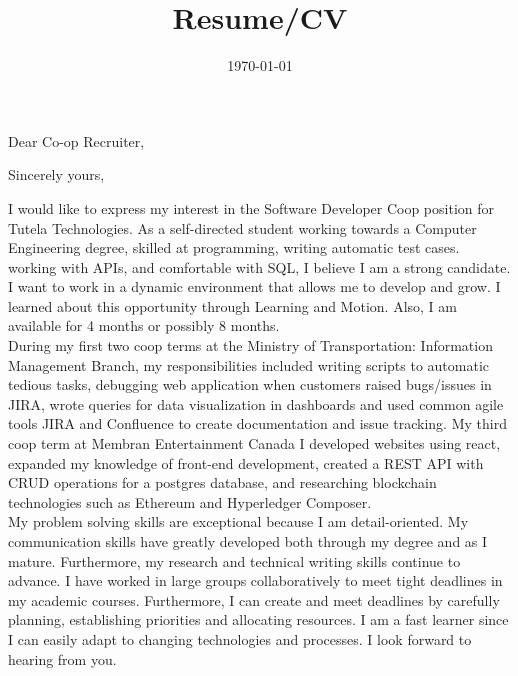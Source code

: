 \documentclass[11pt,a4paper,sans]{moderncv} %
\title{Resume/CV}
\newcommand{\companyName}{Tutela Technologies}%
\newcommand{\positionName}{Software Developer }%
\begin{document}


\clearpage

\recipient{HR Department}{\companyName}
\date{\today} %
\opening{Dear Co-op Recruiter,}
\closing{Sincerely yours, } %

\makelettertitle %
I would like to express my interest in the \positionName Coop position for \companyName. As a self-directed student working towards a Computer Engineering degree, skilled at programming, writing automatic test cases. working with APIs, and comfortable with SQL, I believe I am a strong candidate. I want to work in a dynamic environment that allows me to develop and grow. I learned about this opportunity through Learning and Motion. Also, I am available for 4 months or possibly 8 months. 
 \hfill \break \\

During my first two coop terms at the Ministry of Transportation: Information Management Branch, my responsibilities included writing scripts to automatic tedious tasks, debugging web application when customers raised bugs/issues in JIRA, wrote queries for data visualization in dashboards and used common agile tools JIRA and Confluence to create documentation and issue tracking. My third coop term at Membran Entertainment Canada I developed websites using react, expanded my knowledge of front-end development, created a REST API with CRUD operations for a postgres database, and researching blockchain technologies such as Ethereum and Hyperledger Composer. \hfill \break  \\

My problem solving skills are exceptional because I am detail-oriented. My communication skills have greatly developed both through my degree and as I mature. Furthermore, my research and technical writing skills continue to advance. I have worked in large groups collaboratively to meet tight deadlines in my academic courses. Furthermore, I can create and meet deadlines by carefully planning, establishing priorities and allocating resources. I am a fast learner since I can easily adapt to changing technologies and processes. I look forward to hearing from you.
\end{document}
